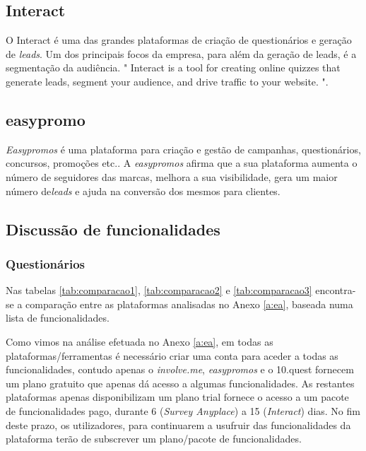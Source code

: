 \subsection{Interact}
\label{interactM}


O Interact é uma das grandes plataformas de criação de questionários e geração de \textit{leads}. Um dos principais focos da empresa, para além da geração de leads, é a segmentação da audiência. " Interact is a tool for creating online quizzes that generate leads, segment your audience, and drive traffic to your website. "\cite{interact}.



\subsection{easypromo}
\label{easypromoM}

\textit{Easypromos}\cite{f6} é uma plataforma para criação e gestão de campanhas, questionários, concursos, promoções etc.. A \textit{easypromos} afirma que a sua plataforma aumenta o número de seguidores das marcas, melhora a sua visibilidade, gera um maior número de\textit{leads} e ajuda na conversão dos mesmos para clientes.


\subsection{Discussão de funcionalidades}
\label{comparacao}

\subsubsection{Questionários}

Nas tabelas \ref{tab:comparacao1}, \ref{tab:comparacao2} e \ref{tab:comparacao3} encontra-se a comparação entre as plataformas analisadas no Anexo \ref{a:ea}, baseada numa lista de funcionalidades.

Como vimos na análise efetuada no Anexo \ref{a:ea}, em todas as plataformas/ferramentas é necessário criar uma conta para aceder a todas as funcionalidades, contudo apenas o \textit{involve.me}, \textit{easypromos} e o 10.quest fornecem um plano gratuito que apenas dá acesso a algumas funcionalidades. As restantes plataformas apenas disponibilizam um plano trial fornece o acesso a um pacote de funcionalidades pago, durante 6 (\textit{Survey Anyplace}) a 15 (\textit{Interact}) dias. No fim deste prazo, os utilizadores, para continuarem a usufruir das funcionalidades da plataforma terão de subscrever um plano/pacote de funcionalidades.

